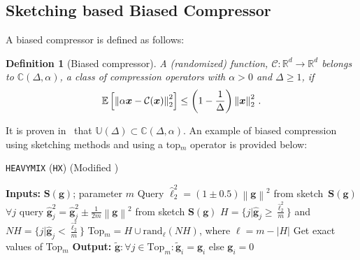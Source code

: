\documentclass[sigconf, anonymous, review]{acmart}
\newtheorem{lemma}{Lemma}
\newtheorem{definition}{Definition}
\begin{document}
\subsection{Sketching based Biased Compressor}


A biased compressor is defined as follows:
\begin{definition}[Biased compressor]
A (randomized) function,  ${\mathcal{C}}:\mathbb{R}^{d}\rightarrow\mathbb{R}^{d}$ belongs to $\mathbb{C}(\Delta,\alpha)$, a class of compression operators with $\alpha>0$ and $\Delta\geq 1$, if
\begin{align}\notag
    \mathbb{E}\left[\left\|\alpha\boldsymbol{x}-{\mathcal{C}}(\boldsymbol{x})\right\|^2_2\right]\leq \left(1-\frac{1}{\Delta}\right)\left\|\boldsymbol{x}\right\|^2_2\, .
\end{align}
\end{definition}
It is proven in~\citep{horvath2020better} that $\mathbb{U}(\Delta)\subset\mathbb{C}(\Delta, \alpha)$.
An example of biased compression using sketching methods and using a top$_m$ operator is provided below:
\begin{algorithm}[H]
\caption{\texttt{HEAVYMIX} (\texttt{HX}) (Modified \citep{ivkin2019communication})}\label{alg:heavymix}
\begin{algorithmic}[1]
\STATE \textbf{Inputs:} $\mathbf{S}({\mathbf{g}})$; parameter $m$
\STATE Query $\hat{\ell}_2^2=\left(1\pm 0.5\right)\left\|\mathbf{g}\right\|^2$ from sketch~$\mathbf{S}(\mathbf{g})$
\STATE $\forall j$ query $\hat{\mathbf{g}}_j^2=\hat{\mathbf{g}}_j^2\pm \frac{1}{2m}\left\|\mathbf{g}\right\|^2$ from sketch $\mathbf{S}(\mathbf{g})$
\STATE $H=\{j|\hat{\mathbf{g}}_j\geq \frac{\hat{\ell}_2^2}{m}\}$ and $NH=\{j|\hat{\mathbf{g}}_j<\frac{\hat{\ell}_2^2}{m}\}$
\STATE Top$_m=H\cup \text{rand}_\ell(NH)$, where $\ell=m-\left|H\right|$
\STATE Get exact values of Top$_m$ 
\STATE \textbf{Output:} $\tilde{\mathbf{g}}:\forall j\in\text{Top}_m:\tilde{\mathbf{g}}_{i}=\mathbf{g}_{i}$ else $ \mathbf{g}_{i}=0$
\end{algorithmic}
\end{algorithm}
\end{document}

